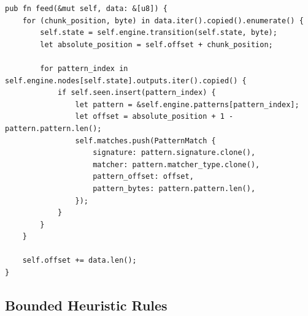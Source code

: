 \documentclass[11pt]{article}
\begin{document}
\begin{lstlisting}[style=sentinel]
pub fn feed(&mut self, data: &[u8]) {
    for (chunk_position, byte) in data.iter().copied().enumerate() {
        self.state = self.engine.transition(self.state, byte);
        let absolute_position = self.offset + chunk_position;

        for pattern_index in self.engine.nodes[self.state].outputs.iter().copied() {
            if self.seen.insert(pattern_index) {
                let pattern = &self.engine.patterns[pattern_index];
                let offset = absolute_position + 1 - pattern.pattern.len();
                self.matches.push(PatternMatch {
                    signature: pattern.signature.clone(),
                    matcher: pattern.matcher_type.clone(),
                    pattern_offset: offset,
                    pattern_bytes: pattern.pattern.len(),
                });
            }
        }
    }

    self.offset += data.len();
}
\end{lstlisting}

\subsection{Bounded Heuristic Rules}
\end{document}
